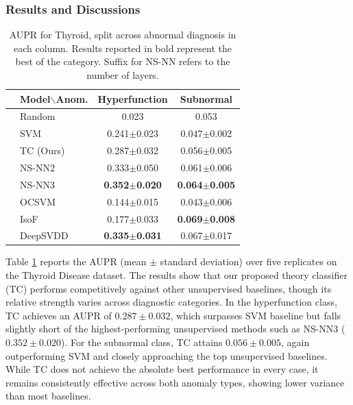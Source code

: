 \documentclass{article}
\begin{document}
\subsubsection{Results and Discussions}
\begin{table}[h]
    \centering
    \caption{AUPR for Thyroid, split across abnormal diagnosis in each column.  Results reported in bold represent the best of the category. Suffix for NS-NN refers to the number of layers.}     
    \begin{tabular}{cl|cc}
        \toprule
        &Model$\backslash$Anom. & Hyperfunction & Subnormal \\
         \midrule
        &Random &  0.023 & 0.053\\
        \midrule
        \parbox[t]{2mm}{} & SVM & 0.241$\pm$0.023 & 0.047$\pm$0.002 \\ %
        &TC (Ours) & 0.287$\pm$0.032 & 0.056$\pm$0.005 \\
        &NS-NN2 & 0.333$\pm$0.050 & 0.061$\pm$0.006 \\
        &NS-NN3 & \bf{0.352$\pm$0.020} & \bf{0.064$\pm$0.005} \\
        \midrule
        \parbox[t]{2mm}{}& OCSVM & 0.144$\pm$0.015 & 0.043$\pm$0.006 \\
        &IsoF & 0.177$\pm$0.033 & \bf{0.069$\pm$0.008} \\ %
        &DeepSVDD & 
    \bf{0.335$\pm$0.031} & 0.067$\pm$0.017 \\ %
         \bottomrule
    \end{tabular}
    \label{tab:thyroid_full}
\end{table}

Table \ref{tab:thyroid_full} reports the AUPR (mean $\pm$ standard deviation) over five replicates on the Thyroid Disease dataset. The results show that our proposed theory classifier (TC) performs competitively against other unsupervised baselines, though its relative strength varies across diagnostic categories. In the hyperfunction class, TC achieves an AUPR of $0.287 \pm 0.032$, which surpasses  SVM baseline but falls slightly short of the highest-performing unsupervised methods such as NS-NN3 ($0.352 \pm 0.020$). For the subnormal class, TC attains $0.056 \pm 0.005$, again outperforming SVM and closely approaching the top unsupervised baselines. While TC does not achieve the absolute best performance in every case, it remains consistently effective across both anomaly types, showing lower variance than most baselines.
\end{document}
